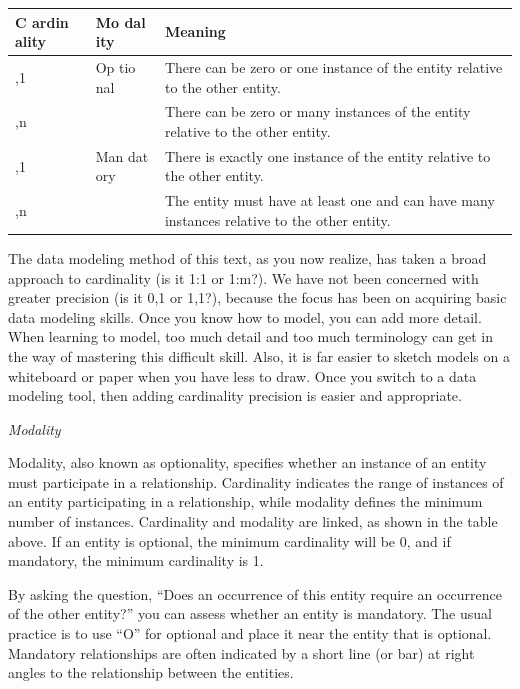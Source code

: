\documentclass[
]{article}
\begin{document}
\begin{longtable}[]{@{}
  >{\raggedright\arraybackslash}p{}
  >{\raggedright\arraybackslash}p{}
  >{\raggedright\arraybackslash}p{}@{}}
\toprule
C ardin
ality & Mo dal
ity & Meaning \\
\midrule
\endhead
0,1 & Op tio
nal & There can be zero or one instance of the
entity relative to the other entity. \\
0,n & & There can be zero or many instances of the
entity relative to the other entity. \\
1,1 & Man dat
ory & There is exactly one instance of the entity
relative to the other entity. \\
1,n & & The entity must have at least one and can
have many instances relative to the other
entity. \\
\bottomrule
\end{longtable}

The data modeling method of this text, as you now realize, has taken a
broad approach to cardinality (is it 1:1 or 1:m?). We have not been
concerned with greater precision (is it 0,1 or 1,1?), because the focus
has been on acquiring basic data modeling skills. Once you know how to
model, you can add more detail. When learning to model, too much detail
and too much terminology can get in the way of mastering this difficult
skill. Also, it is far easier to sketch models on a whiteboard or paper
when you have less to draw. Once you switch to a data modeling tool,
then adding cardinality precision is easier and appropriate.

\emph{Modality}

Modality, also known as optionality, specifies whether an instance of an
entity must participate in a relationship. Cardinality indicates the
range of instances of an entity participating in a relationship, while
modality defines the minimum number of instances. Cardinality and
modality are linked, as shown in the table above. If an entity is
optional, the minimum cardinality will be 0, and if mandatory, the
minimum cardinality is 1.

By asking the question, ``Does an occurrence of this entity require an
occurrence of the other entity?'' you can assess whether an entity is
mandatory. The usual practice is to use ``O'' for optional and place it
near the entity that is optional. Mandatory relationships are often
indicated by a short line (or bar) at right angles to the relationship
between the entities.
\end{document}
